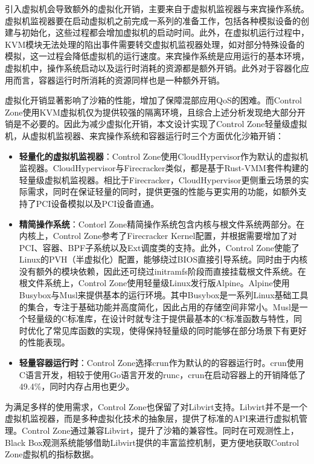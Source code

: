 引入虚拟机会导致额外的虚拟化开销，主要来自于虚拟机监视器与来宾操作系统。虚拟机监视器要在启动虚拟机之前完成一系列的准备工作，包括各种模拟设备的创建与初始化，这些过程都会增加虚拟机的启动时间。此外，在虚拟机运行过程中，KVM模块无法处理的陷出事件需要转交虚拟机监视器处理，如对部分特殊设备的模拟，这一过程会降低虚拟机的运行速度。来宾操作系统是应用运行的基本环境，虚拟机中，操作系统启动以及运行时消耗的资源都是额外开销。此外对于容器化应用而言，容器运行时所消耗的资源同样也是一种额外开销。

虚拟化开销显著影响了沙箱的性能，增加了保障混部应用QoS的困难。而Control Zone使用KVM虚拟机仅为提供较强的隔离环境，且综合上述分析发现绝大部分开销是不必要的。因此为减少虚拟化开销，本文设计实现了Control Zone轻量级虚拟机，从虚拟机监视器、来宾操作系统和容器运行时三个方面优化沙箱开销：

\begin{itemize}

    \item \textbf{轻量化的虚拟机监视器}：Control Zone使用CloudHypervisor作为默认的虚拟机监视器。CloudHypervisor与Firecracker类似，都是基于Rust-VMM套件构建的轻量级虚拟机监视器。相比于Firecracker，CloudHypervisor更侧重云场景的实际需求\citep{agache2020firecracker}，同时在保证轻量的同时，提供更强的性能与更实用的功能，如额外支持了PCI设备模拟以及PCI设备直通。

    \item \textbf{精简操作系统}：Contorl Zone精简操作系统包含内核与根文件系统两部分。在内核上，Control Zone参考了Firecracker Kernel配置，并根据需要增加了对PCI、容器、BPF子系统以及Ext调度类的支持。此外，Control Zone使能了Linux的PVH（半虚拟化）配置，能够绕过BIOS直接引导系统。同时由于内核没有额外的模块依赖，因此还可绕过initramfs阶段而直接挂载根文件系统。在根文件系统上，Control Zone使用轻量级Linux发行版Alpine\citep{alpine}。Alpine使用Busybox与Musl来提供基本的运行环境。其中Busybox是一系列Linux基础工具的集合，专注于基础功能并高度简化，因此占用的存储空间非常小。Musl是一个轻量级的C标准库，在设计时就专注于提供最基本的C标准函数与特性，同时优化了常见库函数的实现，使得保持轻量级的同时能够在部分场景下有更好的性能表现。

    \item \textbf{轻量容器运行时}：Control Zone选择crun\citep{crun}作为默认的的容器运行时。crun使用C语言开发，相较于使用Go语言开发的runc，crun在启动容器上的开销降低了49.4\%，同时内存占用也更少。

\end{itemize}

为满足多样的使用需求，Control Zone也保留了对Libvirt支持。Libvirt并不是一个虚拟机监视器，而是多种虚拟化技术的抽象层，提供了标准的API来进行虚拟机管理。Control Zone通过兼容Libvirt，提升了沙箱的兼容性。同时在可观测性上，Black Box观测系统能够借助Libvirt提供的丰富监控机制，更方便地获取Control Zone虚拟机的指标数据。


